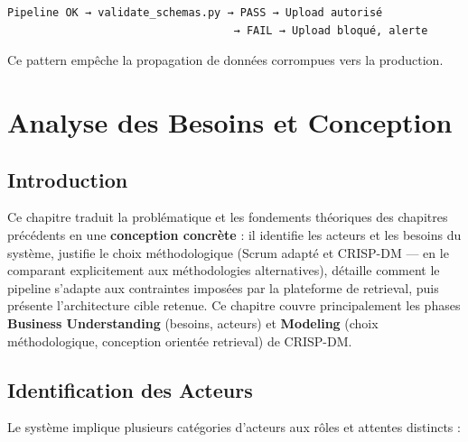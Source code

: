 \documentclass[12pt,a4paper]{report}
\begin{document}
\begin{verbatim}
Pipeline OK → validate_schemas.py → PASS → Upload autorisé
                                   → FAIL → Upload bloqué, alerte
\end{verbatim}

Ce pattern empêche la propagation de données corrompues vers la production.

\chapter{Analyse des Besoins et Conception}
\label{chap:conception}

\section*{Introduction}

Ce chapitre traduit la problématique et les fondements théoriques des chapitres précédents en une \textbf{conception concrète} : il identifie les acteurs et les besoins du système, justifie le choix méthodologique (Scrum adapté et CRISP-DM --- en le comparant explicitement aux méthodologies alternatives), détaille comment le pipeline s'adapte aux contraintes imposées par la plateforme de retrieval, puis présente l'architecture cible retenue. Ce chapitre couvre principalement les phases \textbf{Business Understanding} (besoins, acteurs) et \textbf{Modeling} (choix méthodologique, conception orientée retrieval) de CRISP-DM.

\section{Identification des Acteurs}
\label{sec:acteurs}

Le système implique plusieurs catégories d'acteurs aux rôles et attentes distincts :
\end{document}
